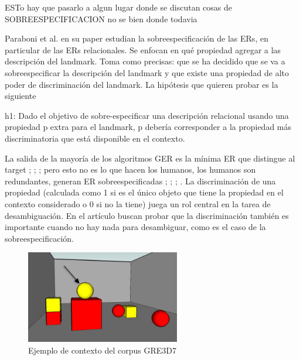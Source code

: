 ESTo hay que pasarlo a algun lugar donde se discutan cosas de SOBREESPECIFICACION no se bien donde todavia

Paraboni et al. en su paper \cite{acl-Paraboni15} estudian la sobreespecificaci\'on de las ERs, en particular de las ERs relacionales.
  Se enfocan en qu\'e propiedad agregar a las descripci\'on del landmark. Toma como precisas:
que se ha decidido que se va a sobreespecificar la descripci\'on del landmark
y que existe una propiedad de alto poder de discriminaci\'on del landmark.
La hip\'otesis que quieren probar es la siguiente

\begin{displayquote}h1: Dado el objetivo de sobre-especificar una descripci\'on relacional usando una propiedad p extra para el landmark, p deber\'ia corresponder a la propiedad m\'as discriminatoria que est\'a disponible en el contexto. 
\end{displayquote}
La salida de la mayor\'ia de los algoritmos GER es la m\'inima ER que distingue al target ; ; ; pero esto no es lo que hacen los humanos, los humanos son redundantes, generan ER sobreespecificadas ; ; ; . La discriminaci\'on de una propiedad (calculada como 1 si es el \'unico objeto que tiene la propiedad en el contexto considerado o 0 si no la tiene) juega un rol central en la tarea de desambiguaci\'on. En el art\'iculo buscan probar que la discriminaci\'on tambi\'en es importante cuando no hay nada para desambiguar, como es el caso de la sobreespecificaci\'on.




\begin{figure}[ht]
\centering
\includegraphics[width=0.6\textwidth]{images/7.jpg}
\caption{Ejemplo de contexto del corpus GRE3D7}
\label{GRE3D7-stimulus7}
\end{figure}

